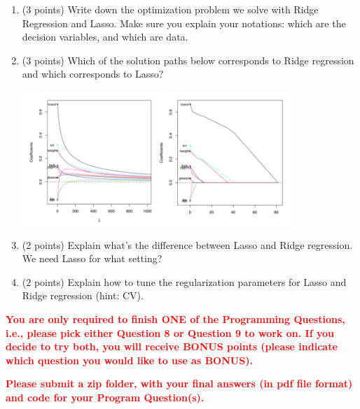 \documentclass[a4paper,12pt,fleqn]{article}
\begin{document}
\begin{enumerate}
\item (3 points) Write down the optimization problem we solve with Ridge Regression and Lasso. Make sure you explain your notations: which are the decision variables, and which are data. 

\vspace{1.5in}


\item (3 points) Which of the solution paths below corresponds to Ridge regression and which corresponds to Lasso?
%
\begin{center}
\includegraphics[width = 0.8\textwidth]{./fig/path}
\end{center}

\vspace{0.3in}

\item (2 points) Explain what's the difference between Lasso and Ridge regression. We need Lasso for what setting?

\vspace{0.9in}

\item (2 points) Explain how to tune the regularization parameters for Lasso and Ridge regression (hint: CV). 

\vspace{1.5in}

\end{enumerate}


\clearpage 

\textcolor{red}{\bf
You are only required to finish ONE of the Programming Questions, i.e., please pick either Question 8 or Question 9 to work on. If you decide to try both, you will receive BONUS points (please indicate which question you would like to use as BONUS).
}

\textcolor{red}{\bf Please submit a zip folder, with your final answers (in pdf file format) and code for your Program Question(s).}
\end{document}
